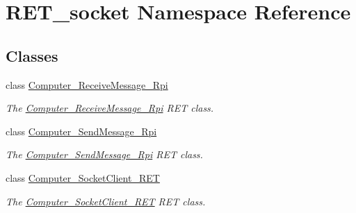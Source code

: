 \hypertarget{namespaceRET__socket}{}\section{R\+E\+T\+\_\+socket Namespace Reference}
\label{namespaceRET__socket}
\subsection*{Classes}
\begin{DoxyCompactItemize}
\item 
class \hyperlink{classRET__socket_1_1Computer__ReceiveMessage__Rpi}{Computer\+\_\+\+Receive\+Message\+\_\+\+Rpi}
\begin{DoxyCompactList}\small\item\em The \hyperlink{classRET__socket_1_1Computer__ReceiveMessage__Rpi}{Computer\+\_\+\+Receive\+Message\+\_\+\+Rpi} R\+ET class. \end{DoxyCompactList}\item 
class \hyperlink{classRET__socket_1_1Computer__SendMessage__Rpi}{Computer\+\_\+\+Send\+Message\+\_\+\+Rpi}
\begin{DoxyCompactList}\small\item\em The \hyperlink{classRET__socket_1_1Computer__SendMessage__Rpi}{Computer\+\_\+\+Send\+Message\+\_\+\+Rpi} R\+ET class. \end{DoxyCompactList}\item 
class \hyperlink{classRET__socket_1_1Computer__SocketClient__RET}{Computer\+\_\+\+Socket\+Client\+\_\+\+R\+ET}
\begin{DoxyCompactList}\small\item\em The \hyperlink{classRET__socket_1_1Computer__SocketClient__RET}{Computer\+\_\+\+Socket\+Client\+\_\+\+R\+ET} R\+ET class. \end{DoxyCompactList}\end{DoxyCompactItemize}
